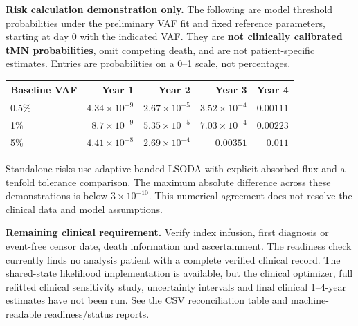 \textbf{Risk calculation demonstration only.} The following are model threshold probabilities under the preliminary VAF fit and fixed reference parameters, starting at day 0 with the indicated VAF. They are \textbf{not clinically calibrated tMN probabilities}, omit competing death, and are not patient-specific estimates. Entries are probabilities on a 0--1 scale, not percentages.

\begin{center}
\begin{tabular}{@{}lrrrr@{}}
\toprule
Baseline VAF & Year 1 & Year 2 & Year 3 & Year 4\\\midrule
0.5\% & $4.34\times10^{-9}$ & $2.67\times10^{-5}$ & $3.52\times10^{-4}$ & $0.00111$ \\
1\% & $8.7\times10^{-9}$ & $5.35\times10^{-5}$ & $7.03\times10^{-4}$ & $0.00223$ \\
5\% & $4.41\times10^{-8}$ & $2.69\times10^{-4}$ & $0.00351$ & $0.011$ \\
\bottomrule
\end{tabular}
\end{center}
Standalone risks use adaptive banded LSODA with explicit absorbed flux and a tenfold tolerance comparison. The maximum absolute difference across these demonstrations is below $3\times10^{-10}$. This numerical agreement does not resolve the clinical data and model assumptions.

\textbf{Remaining clinical requirement.} Verify index infusion, first diagnosis or event-free censor date, death information and ascertainment. The readiness check currently finds no analysis patient with a complete verified clinical record. The shared-state likelihood implementation is available, but the clinical optimizer, full refitted clinical sensitivity study, uncertainty intervals and final clinical 1--4-year estimates have not been run. See the CSV reconciliation table and machine-readable readiness/status reports.
